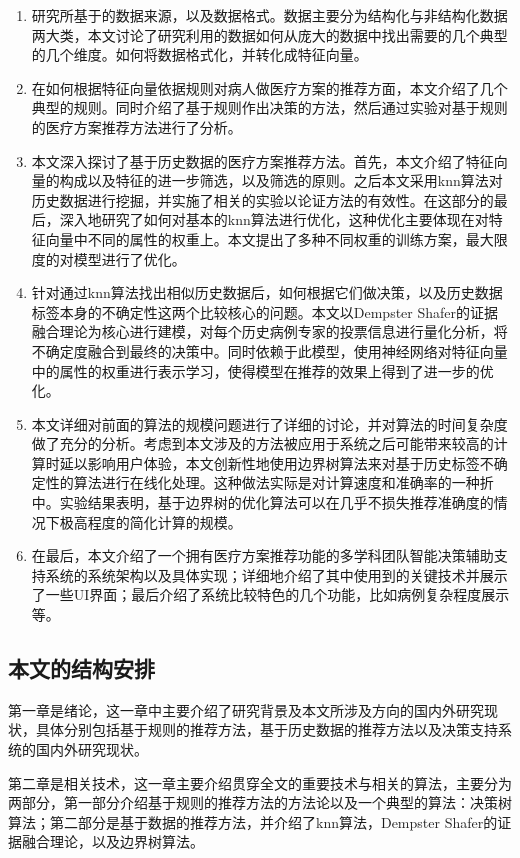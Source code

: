 \begin{enumerate}
  \item 研究所基于的数据来源，以及数据格式。数据主要分为结构化与非结构化数据两大类，本文讨论了研究利用的数据如何从庞大的数据中找出需要的几个典型的几个维度。如何将数据格式化，并转化成特征向量。
  \item 在如何根据特征向量依据规则对病人做医疗方案的推荐方面，本文介绍了几个典型的规则。同时介绍了基于规则作出决策的方法，然后通过实验对基于规则的医疗方案推荐方法进行了分析。
  \item 本文深入探讨了基于历史数据的医疗方案推荐方法。首先，本文介绍了特征向量的构成以及特征的进一步筛选，以及筛选的原则。之后本文采用knn算法对历史数据进行挖掘，并实施了相关的实验以论证方法的有效性。在这部分的最后，深入地研究了如何对基本的knn算法进行优化，这种优化主要体现在对特征向量中不同的属性的权重上。本文提出了多种不同权重的训练方案，最大限度的对模型进行了优化。
  \item 针对通过knn算法找出相似历史数据后，如何根据它们做决策，以及历史数据标签本身的不确定性这两个比较核心的问题。本文以Dempster Shafer的证据融合理论为核心进行建模，对每个历史病例专家的投票信息进行量化分析，将不确定度融合到最终的决策中。同时依赖于此模型，使用神经网络对特征向量中的属性的权重进行表示学习，使得模型在推荐的效果上得到了进一步的优化。
  \item 本文详细对前面的算法的规模问题进行了详细的讨论，并对算法的时间复杂度做了充分的分析。考虑到本文涉及的方法被应用于系统之后可能带来较高的计算时延以影响用户体验，本文创新性地使用边界树算法来对基于历史标签不确定性的算法进行在线化处理。这种做法实际是对计算速度和准确率的一种折中。实验结果表明，基于边界树的优化算法可以在几乎不损失推荐准确度的情况下极高程度的简化计算的规模。
  \item 在最后，本文介绍了一个拥有医疗方案推荐功能的多学科团队智能决策辅助支持系统的系统架构以及具体实现；详细地介绍了其中使用到的关键技术并展示了一些UI界面；最后介绍了系统比较特色的几个功能，比如病例复杂程度展示等。
\end{enumerate}

\subsection{本文的结构安排}

第一章是绪论，这一章中主要介绍了研究背景及本文所涉及方向的国内外研究现状，具体分别包括基于规则的推荐方法，基于历史数据的推荐方法以及决策支持系统的国内外研究现状。

第二章是相关技术，这一章主要介绍贯穿全文的重要技术与相关的算法，主要分为两部分，第一部分介绍基于规则的推荐方法的方法论以及一个典型的算法：决策树算法；第二部分是基于数据的推荐方法，并介绍了knn算法，Dempster Shafer的证据融合理论，以及边界树算法。

